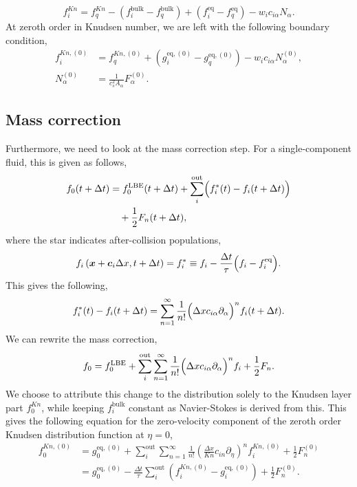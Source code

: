 \documentclass[aps,physrev,twocolumn,10pt]{revtex4-2}
\begin{document}
\begin{equation}
    f_i^\textit{Kn} = f_q^\textit{Kn} - \left(f_i^\text{bulk} - f_q^\text{bulk}\right) + \left(f_i^\text{eq} - f_q^\text{eq}\right) - w_i c_{i\alpha}N_\alpha.
\end{equation}
At zeroth order in Knudsen number, we are left with the following boundary condition,
\begin{equation}
\begin{split}
    f_i^{\textit{Kn},(0)} &= f_q^{\textit{Kn},(0)} + \left(g_i^{\text{eq},(0)} - g_q^{\text{eq},(0)}\right) - w_i c_{i\alpha}N_\alpha^{(0)},\\
    N_\alpha^{(0)} &=  \frac{1}{c_s^2 A_\alpha} F_\alpha^{(0)}.
\end{split}
\end{equation}
\subsection{Mass correction}
Furthermore, we need to look at the mass correction step. For a single-component fluid, this is given as follows,
\begin{equation}
\begin{split}
    f_0(t+\Delta t) &= f_0^\text{LBE}(t + \Delta t) + \sum_i^\text{out}\Bigl(f_i^*(t) - f_i(t+\Delta t)\Bigr)\\
    &\quad + \frac{1}{2}F_n(t+\Delta t),
\end{split}
\end{equation}
where the star indicates after-collision populations,
\begin{equation}
    f_i\left(\bm{x}+\bm{c}_i \Delta x, t + \Delta t\right) = f_i^* \equiv f_i - \frac{\Delta t}{\tau}\Bigl(f_i - f_i^\text{eq}\Bigr).
\end{equation}
This gives the following,
\begin{equation}
    f_i^*(t) - f_i(t+\Delta t) = \sum_{n=1}^\infty \frac{1}{n!}\Bigl(\Delta x c_{i\alpha} \partial_\alpha\Bigr)^n f_i(t+\Delta t).
\end{equation}
We can rewrite the mass correction,
\begin{equation}
    f_0 = f_0^\text{LBE} + \sum_i^\text{out}\sum_{n=1}^\infty \frac{1}{n!}\Bigl(\Delta x c_{i\alpha} \partial_\alpha\Bigr)^n f_i + \frac{1}{2}F_n.
\end{equation}
We choose to attribute this change to the distribution solely to the Knudsen layer part $f_0^\textit{Kn}$, while keeping $f_i^\text{bulk}$ constant as Navier-Stokes is derived from this. This gives the following equation for the zero-velocity component of the zeroth order Knudsen distribution function at $\eta = 0$, 
\begin{equation}
\begin{split}
    f_0^{\textit{Kn},(0)} &=g_0^{\text{eq},(0)} + \sum_i^\text{out}\sum_{n=1}^\infty \frac{1}{n!}\left(\frac{\Delta x}{\textit{Kn}} c_{in} \partial_\eta\right)^n f_i^{\textit{Kn},(0)} + \frac{1}{2}F_n^{(0)}\\
    &= g_0^{\text{eq},(0)} - \frac{\Delta t}{\tau}\sum_i^\text{out}\left(f_i^{\textit{Kn},(0)} - g_i^{\text{eq},(0)}\right) + \frac{1}{2}F_n^{(0)}.
\end{split}
\end{equation}
\end{document}

